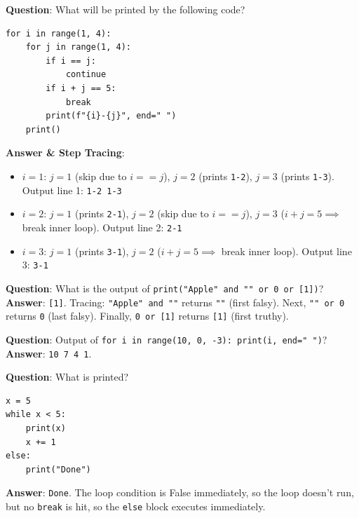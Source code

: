 \begin{outputprediction}
\textbf{Question}: What will be printed by the following code?
\begin{lstlisting}[language=Python3]
for i in range(1, 4):
    for j in range(1, 4):
        if i == j:
            continue
        if i + j == 5:
            break
        print(f"{i}-{j}", end=" ")
    print()
\end{lstlisting}
\textbf{Answer \& Step Tracing}:
\begin{itemize}
    \item $i=1$: $j=1$ (skip due to $i==j$), $j=2$ (prints \texttt{1-2}), $j=3$ (prints \texttt{1-3}). Output line 1: \texttt{1-2 1-3}
    \item $i=2$: $j=1$ (prints \texttt{2-1}), $j=2$ (skip due to $i==j$), $j=3$ ($i+j=5 \implies$ break inner loop). Output line 2: \texttt{2-1}
    \item $i=3$: $j=1$ (prints \texttt{3-1}), $j=2$ ($i+j=5 \implies$ break inner loop). Output line 3: \texttt{3-1}
\end{itemize}
\end{outputprediction}

\begin{outputprediction}
\textbf{Question}: What is the output of \texttt{print("Apple" and "" or 0 or [1])}? \\
\textbf{Answer}: \texttt{[1]}. Tracing: \texttt{"Apple" and ""} returns \texttt{""} (first falsy). Next, \texttt{"" or 0} returns \texttt{0} (last falsy). Finally, \texttt{0 or [1]} returns \texttt{[1]} (first truthy).
\end{outputprediction}

\begin{outputprediction}
\textbf{Question}: Output of \texttt{for i in range(10, 0, -3): print(i, end=" ")}? \\
\textbf{Answer}: \texttt{10 7 4 1}.
\end{outputprediction}

\begin{outputprediction}
\textbf{Question}: What is printed?
\begin{lstlisting}[language=Python3]
x = 5
while x < 5:
    print(x)
    x += 1
else:
    print("Done")
\end{lstlisting}
\textbf{Answer}: \texttt{Done}. The loop condition is False immediately, so the loop doesn't run, but no \texttt{break} is hit, so the \texttt{else} block executes immediately.
\end{outputprediction}

